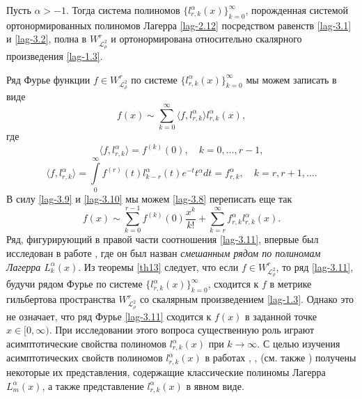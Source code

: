 \begin{theorem}\label{th13}
	Пусть $\alpha>-1$. Тогда система полиномов $\{l_{r,k}^{\alpha}(x)\}_{k=0}^\infty$, порожденная системой ортонормированных полиномов Лагерра \eqref{lag-2.12} посредством равенств \eqref{lag-3.1} и \eqref{lag-3.2}, полна  в $W^r_{\mathcal{L}^2_\rho}$ и ортонормирована относительно скалярного произведения \eqref{lag-1.3}.
\end{theorem}

Ряд Фурье функции $f\in W^r_{\mathcal{L}^2_\rho}$ по системе $\{l_{r,k}^{\alpha}(x)\}_{k=0}^\infty$
мы можем записать в виде
\begin{equation}\label{lag-3.8}
f(x)\sim  \sum_{k=0}^\infty \langle f,l_{r,k}^\alpha \rangle  l_{r,k}^\alpha(x),
\end{equation}
где
\begin{equation}\label{lag-3.9}
\langle f,l_{r,k}^\alpha \rangle = f^{(k)}(0),\quad k=0,\ldots, r-1,
\end{equation}
\begin{equation}\label{lag-3.10}
\langle f,l_{r,k}^\alpha \rangle = \int\limits_0^\infty f^{(r)}(t) l_{k-r}^\alpha(t)e^{-t}t^\alpha dt=f_{r,k}^\alpha,\quad k=r,r+1,\ldots.
\end{equation}
В силу \eqref{lag-3.9}  и \eqref{lag-3.10} мы можем \eqref{lag-3.8} переписать еще так
\begin{equation}\label{lag-3.11}
f(x)\sim \sum_{k=0}^{r-1} f^{(k)}(0)\frac{x^k}{k!}+ \sum_{k=r}^\infty f_{r,k}^\alpha l_{r,k}^\alpha(x).
\end{equation}
Ряд, фигурирующий в правой части соотношения \eqref{lag-3.11}, впервые был исследован в работе \cite{Shar13}, где он был назван \textit{смешанным рядом по полиномам Лагерра $L_{k}^\alpha(x)$}. Из теоремы \ref{th13} следует, что если   $f\in W^r_{\mathcal{L}^2_\rho}$, то ряд \eqref{lag-3.11}, будучи  рядом Фурье  по системе $\{l_{r,k}^{\alpha}(x)\}_{k=0}^\infty$, сходится к $f$ в метрике гильбертова пространства $W^r_{\mathcal{L}^2_\rho}$ со скалярным произведением \eqref{lag-1.3}.
Однако это не означает, что ряд Фурье \eqref{lag-3.11} сходится к $f(x)$ в заданной точке $x\in[0,\infty)$.  При исследовании этого вопроса существенную роль играют асимптотические свойства полиномов $l_{r,k}^{\alpha}(x)$ при $k\to\infty$. С целью изучения асимптотических свойств  полиномов $l_{r,k}^{\alpha}(x)$ в работах \cite{SHII}, \cite{SharSMJ2017},  \cite{SharDiffur2018} (см. также \cite{Shar13}) получены некоторые их представления, содержащие   классические полиномы Лагерра $L_{m}^{\alpha}(x)$, а также представление $l_{r,k}^{\alpha}(x)$  в явном виде.

